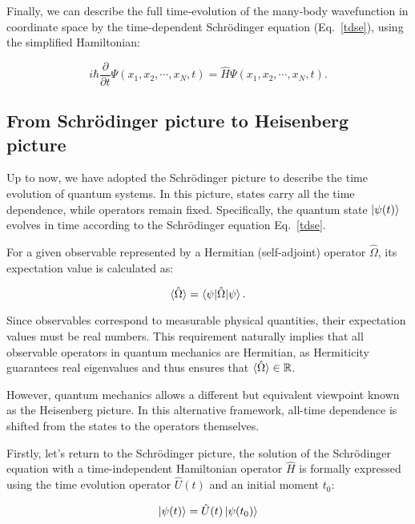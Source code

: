 Finally, we can describe the full time‐evolution of the many‐body wavefunction in coordinate space by the time‐dependent Schrödinger equation (Eq.~\eqref{tdse}), using the simplified Hamiltonian:

\begin{equation}
    i\hbar\frac{\partial}{\partial t}\Psi(x_1,x_2,\cdots,x_N,t)
    = \hat{H}\Psi(x_1,x_2,\cdots,x_N,t).
    \label{tdse_manybody_coord}
\end{equation}

\subsection{From Schrödinger picture to Heisenberg picture}

Up to now, we have adopted the Schrödinger picture to describe the time evolution of quantum systems. In this picture, states carry all the time dependence, while operators remain fixed. Specifically, the quantum state $\ket{\psi(t)}$ evolves in time according to the Schrödinger equation Eq.~\eqref{tdse}.

For a given observable represented by a Hermitian (self-adjoint) operator $\hat{\Omega}$, its expectation value is calculated as:

\begin{equation}
    \braket{\hat{\Omega}} = \braket{\psi|\hat{\Omega}|\psi}.
    \label{expectation_Hermitian}
\end{equation}

Since observables correspond to measurable physical quantities, their expectation values must be real numbers. This requirement naturally implies that all observable operators in quantum mechanics are Hermitian, as Hermiticity guarantees real eigenvalues and thus ensures that $\braket{\hat{\Omega}}\in \mathbb{R}$.

However, quantum mechanics allows a different but equivalent viewpoint known as the Heisenberg picture. 
In this alternative framework, all-time dependence is shifted from the states to the operators themselves.

Firstly, let's return to the Schrödinger picture, the solution of the Schrödinger equation with a time-independent Hamiltonian operator $\hat{H}$ is formally expressed using the time evolution operator $\hat{U}(t)$ and an initial moment $t_0$:

\begin{equation}
    \ket{\psi(t)}=\hat{U}(t)\ket{\psi(t_0)}
    \label{given_evolution_s}
\end{equation}

